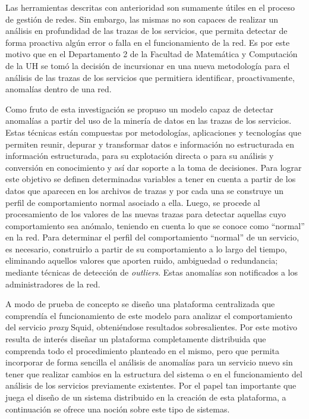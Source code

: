 Las herramientas descritas con anterioridad son sumamente útiles en el proceso
de gestión de redes. Sin embargo, las mismas no son capaces de realizar un
análisis en profundidad de las trazas de los servicios, que permita detectar de
forma proactiva algún error o falla en el funcionamiento de la red. Es por este
motivo que en el Departamento 2 de la Facultad de Matemática y Computación de la
UH se tomó la decisión de incursionar en una nueva metodología para el análisis
de las trazas de los servicios que permitiera identificar, proactivamente,
anomalías dentro de una red.
 
Como fruto de esta investigación se propuso un modelo\cite{Gonzalez2008} capaz
de detectar anomalías a partir del uso de la minería de datos en las trazas de
los servicios. Estas técnicas están compuestas por metodologías, aplicaciones y
tecnologías que permiten reunir, depurar y transformar datos e información no
estructurada en información estructurada, para su explotación directa o para su
análisis y conversión en conocimiento y así dar soporte a la toma de decisiones.
Para lograr este objetivo se definen determinadas variables a tener en cuenta a
partir de los datos que aparecen en los archivos de trazas y por cada una se
construye un perfil de comportamiento normal asociado a ella. Luego, se procede
al procesamiento de los valores de las nuevas trazas para detectar aquellas cuyo
comportamiento sea anómalo, teniendo en cuenta lo que se conoce como ``normal''
en la red. Para determinar el perfil del comportamiento ``normal'' de un
servicio, es necesario, construirlo a partir de su comportamiento a lo largo del
tiempo, eliminando aquellos valores que aporten ruido, ambiguedad o redundancia;
mediante técnicas de detección de \textit{outliers}. Estas anomalías son
notificados a los administradores de la red. 

A modo de prueba de concepto se diseño una plataforma\cite{Gonzalez2008}
centralizada que comprendía el funcionamiento de este modelo para analizar el
comportamiento del servicio \textit{proxy} Squid, obteniéndose resultados
sobresalientes. Por este motivo resulta de interés diseñar un plataforma
completamente distribuida que comprenda todo el procedimiento planteado en el
mismo, pero que permita incorporar de forma sencilla el análisis de anomalías
para un servicio nuevo sin tener que realizar cambios en la estructura del
sistema o en el funcionamiento del análisis de los servicios previamente
existentes. Por el papel tan importante que juega el diseño de un sistema
distribuido en la creación de esta plataforma, a continuación se ofrece una
noción sobre este tipo de sistemas.

